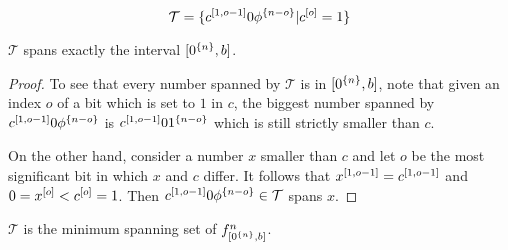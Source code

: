 \begin{equation*}
\mathcal{T} =
\{c^{[1, o - 1]} 0 \phi^{\{n - o\}} | c^{[o]} = 1\}
\end{equation*}

\begin{theorem}[Feasibility]
\label{theorem:prefixfeasible}
$\mathcal{T}$ spans exactly the interval
$[0^{\{n\}}, b]$.
\end{theorem}

\begin{proof}
To see that every number spanned by $\mathcal{T}$
is in $[0^{\{n\}}, b]$,
note that given an index $o$ of a bit which is set to $1$
in $c$,
the biggest number spanned by
$c^{[1, o-1]} 0 \phi^{\{n-o\}}$ is
$c^{[1, o-1]} 0 1^{\{n-o\}}$
which is still strictly smaller than $c$.

On the other hand,
consider a number $x$ smaller than $c$
and let $o$ be the most significant bit in which $x$ and $c$ differ. It follows that
$x^{[1, o-1]} = c^{[1, o-1]}$
and $0 = x^{[o]} < c^{[o]} = 1$.
Then
$c^{[1, o - 1]} 0 \phi^{\{n - o\}} \in \mathcal{T}$
spans $x$.
\end{proof}

\begin{theorem}[Optimality]
\label{proof:prefixoptimal}
$\mathcal{T}$ is the minimum spanning set of
$f^{n}_{[0^{\{n\}}, b]}$.
\end{theorem}

